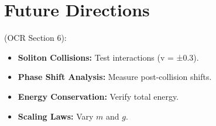 \documentclass{article}
\begin{document}
\section{Future Directions}
(OCR Section 6):
\begin{itemize}
    \item \textbf{Soliton Collisions:} Test interactions (v = ±0.3).
    \item \textbf{Phase Shift Analysis:} Measure post-collision shifts.
    \item \textbf{Energy Conservation:} Verify total energy.
    \item \textbf{Scaling Laws:} Vary \(m\) and \(g\).
\end{itemize}
\end{document}
